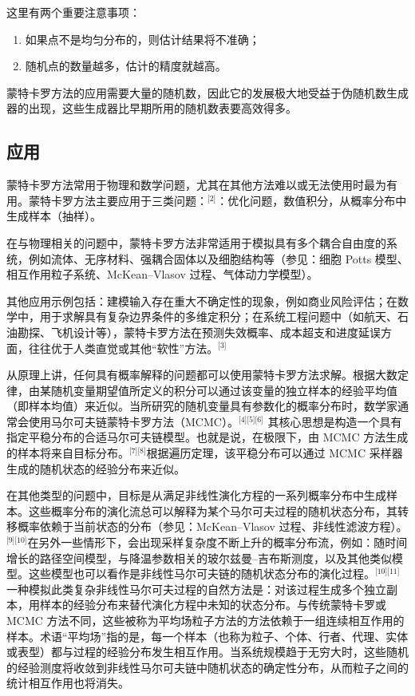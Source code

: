 这里有两个重要注意事项：
\begin{enumerate}
\item 如果点不是均匀分布的，则估计结果将不准确；
\item 随机点的数量越多，估计的精度就越高。
\end{enumerate}
蒙特卡罗方法的应用需要大量的随机数，因此它的发展极大地受益于伪随机数生成器的出现，这些生成器比早期所用的随机数表要高效得多。
\subsection{应用}
蒙特卡罗方法常用于物理和数学问题，尤其在其他方法难以或无法使用时最为有用。蒙特卡罗方法主要应用于三类问题：\(^\text{[2]}\)：优化问题，数值积分，从概率分布中生成样本（抽样）。

在与物理相关的问题中，蒙特卡罗方法非常适用于模拟具有多个耦合自由度的系统，例如流体、无序材料、强耦合固体以及细胞结构等（参见：细胞 Potts 模型、相互作用粒子系统、McKean–Vlasov 过程、气体动力学模型）。

其他应用示例包括：建模输入存在重大不确定性的现象，例如商业风险评估；在数学中，用于求解具有复杂边界条件的多维定积分；在系统工程问题中（如航天、石油勘探、飞机设计等），蒙特卡罗方法在预测失效概率、成本超支和进度延误方面，往往优于人类直觉或其他“软性”方法。\(^\text{[3]}\)

从原理上讲，任何具有概率解释的问题都可以使用蒙特卡罗方法求解。根据大数定律，由某随机变量期望值所定义的积分可以通过该变量的独立样本的经验平均值（即样本均值）来近似。当所研究的随机变量具有参数化的概率分布时，数学家通常会使用马尔可夫链蒙特卡罗方法（MCMC）。\(^\text{[4][5][6]}\) 其核心思想是构造一个具有指定平稳分布的合适马尔可夫链模型。也就是说，在极限下，由 MCMC 方法生成的样本将来自目标分布。\(^\text{[7][8]}\)根据遍历定理，该平稳分布可以通过 MCMC 采样器生成的随机状态的经验分布来近似。

在其他类型的问题中，目标是从满足非线性演化方程的一系列概率分布中生成样本。这些概率分布的演化流总可以解释为某个马尔可夫过程的随机状态分布，其转移概率依赖于当前状态的分布（参见：McKean–Vlasov 过程、非线性滤波方程）。\(^\text{[9][10]}\)在另外一些情形下，会出现采样复杂度不断上升的概率分布流，例如：随时间增长的路径空间模型，与降温参数相关的玻尔兹曼–吉布斯测度，以及其他类似模型。这些模型也可以看作是非线性马尔可夫链的随机状态分布的演化过程。\(^\text{[10][11]}\)一种模拟此类复杂非线性马尔可夫过程的自然方法是：对该过程生成多个独立副本，用样本的经验分布来替代演化方程中未知的状态分布。与传统蒙特卡罗或 MCMC 方法不同，这些被称为平均场粒子方法的方法依赖于一组连续相互作用的样本。术语“平均场”指的是，每一个样本（也称为粒子、个体、行者、代理、实体或表型）都与过程的经验分布发生相互作用。当系统规模趋于无穷大时，这些随机的经验测度将收敛到非线性马尔可夫链中随机状态的确定性分布，从而粒子之间的统计相互作用也将消失。
